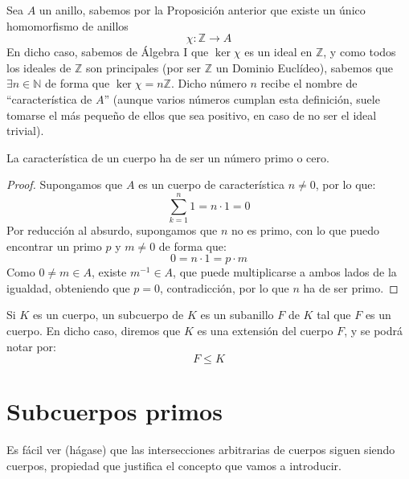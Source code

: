 \begin{definicion}
    Sea $A$ un anillo, sabemos por la Proposición anterior que existe un único homomorfismo de anillos 
    \begin{equation*}
        \chi:\mathbb{Z}\to A
    \end{equation*}
    En dicho caso, sabemos de Álgebra I que $\ker\chi$ es un ideal en $\mathbb{Z}$, y como todos los ideales de $\mathbb{Z}$ son principales (por ser $\mathbb{Z}$ un Dominio Euclídeo), sabemos que $\exists n\in \mathbb{N}$ de forma que $\ker\chi = n\mathbb{Z}$. Dicho número $n$ recibe el nombre de ``característica de $A$'' (aunque varios números cumplan esta definición, suele tomarse el más pequeño de ellos que sea positivo, en caso de no ser el ideal trivial).
\end{definicion}

\begin{prop}
    La característica de un cuerpo ha de ser un número primo o cero.
    \begin{proof}
        Supongamos que $A$ es un cuerpo de característica $n\neq 0$, por lo que:
        \begin{equation*}
            \sum_{k=1}^{n}1 = n\cdot 1 = 0
        \end{equation*}
        Por reducción al absurdo, supongamos que $n$ no es primo, con lo que puedo encontrar un primo $p$ y $m\neq 0$ de forma que:
        \begin{equation*}
            0 = n\cdot 1 = p\cdot m
        \end{equation*}
        Como $0\neq m \in A$, existe $m^{-1}\in A$, que puede multiplicarse a ambos lados de la igualdad, obteniendo que $p = 0$, contradicción, por lo que $n$ ha de ser primo.
    \end{proof}
\end{prop}

\begin{definicion}
    Si $K$ es un cuerpo, un subcuerpo de $K$ es un subanillo $F$ de $K$ tal que $F$ es un cuerpo. En dicho caso, diremos que $K$ es una extensión del cuerpo $F$, y se podrá notar por:
    \begin{equation*}
        F\leq K
    \end{equation*}
\end{definicion}

\section{Subcuerpos primos}
\noindent
Es fácil ver (hágase) que las intersecciones arbitrarias de cuerpos siguen siendo cuerpos, propiedad que justifica el concepto que vamos a introducir.

